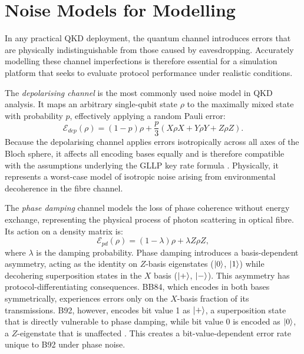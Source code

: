 \documentclass[10pt, a4paper]{report}
\begin{document}
\section{Noise Models for Modelling} 

In any practical QKD deployment, the quantum channel introduces errors that are physically indistinguishable from those caused by eavesdropping. Accurately modelling these channel imperfections is therefore essential for a simulation platform that seeks to evaluate protocol performance under realistic conditions.

The \textit{depolarising channel} is the most commonly used noise model in QKD analysis. It maps an arbitrary single-qubit state $\rho$ to the maximally mixed state with probability $p$, effectively applying a random Pauli error:
%
\begin{equation}
\label{eq:depolarising}
\mathcal{E}_{dep}(\rho) = (1-p)\rho + \frac{p}{3}(X\rho X + Y\rho Y + Z\rho Z).
\end{equation}
%
Because the depolarising channel applies errors isotropically across all axes of the Bloch sphere, it affects all encoding bases equally and is therefore compatible with the assumptions underlying the GLLP key rate formula \cite{GLLP2004}. Physically, it represents a worst-case model of isotropic noise arising from environmental decoherence in the fibre channel.


The \textit{phase damping} channel models the loss of phase coherence without energy exchange, representing the physical process of photon scattering in optical fibre. Its action on a density matrix is:
%
\begin{equation}
\label{eq:phase-damping}
\mathcal{E}_{pd}(\rho) = (1-\lambda)\rho + \lambda Z\rho Z,
\end{equation}
%
where $\lambda$ is the damping probability. Phase damping introduces a basis-dependent asymmetry, acting as the identity on $Z$-basis eigenstates ($\ket{0}$, $\ket{1}$) while decohering superposition states in the $X$ basis ($\ket{+}$, $\ket{-}$). This asymmetry has protocol-differentiating consequences. BB84, which encodes in both bases symmetrically, experiences errors only on the $X$-basis fraction of its transmissions. B92, however, encodes bit value 1 as $\ket{+}$, a superposition state that is directly vulnerable to phase damping, while bit value 0 is encoded as $\ket{0}$, a $Z$-eigenstate that is unaffected \cite{QKDbible}. This creates a bit-value-dependent error rate unique to B92 under phase noise.
\end{document}
